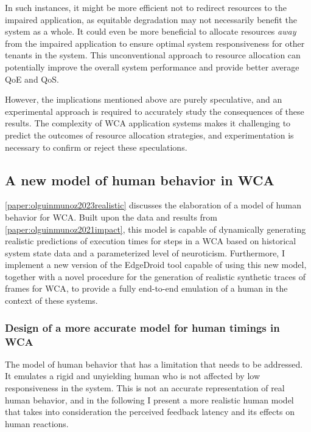 In such instances, it might be more efficient not to redirect resources to the impaired application, as equitable degradation may not necessarily benefit the system as a whole.
It could even be more beneficial to allocate resources \emph{away} from the impaired application to ensure optimal system responsiveness for other tenants in the system.
This unconventional approach to resource allocation can potentially improve the overall system performance and provide better average \gls{QoE} and \gls{QoS}.

However, the implications mentioned above are purely speculative, and an experimental approach is required to accurately study the consequences of these results.
The complexity of \gls{WCA} application systems makes it challenging to predict the outcomes of resource allocation strategies, and experimentation is necessary to confirm or reject these speculations.

\subsection{A new model of human behavior in \acs{WCA}}

\cref{paper:olguinmunoz2023realistic} discusses the elaboration of a model of human behavior for \gls{WCA}.
Built upon the data and results from \cref{paper:olguinmunoz2021impact}, this model is capable of dynamically generating realistic predictions of execution times for steps in a \gls{WCA} based on historical system state data and a parameterized level of neuroticism.
Furthermore, I implement a new version of the EdgeDroid tool capable of using this new model, together with a novel procedure for the generation of realistic synthetic traces of frames for \gls{WCA}, to provide a fully end-to-end emulation of a human in the context of these systems.

\subsubsection{Design of a more accurate model for human timings in \gls{WCA}}\label{sec:improved_model}

The model of human behavior that has a limitation that needs to be addressed.
It emulates a rigid and unyielding human who is not affected by low responsiveness in the system.
This is not an accurate representation of real human behavior, and in the following I present a more realistic human model that takes into consideration the perceived feedback latency and its effects on human reactions.

